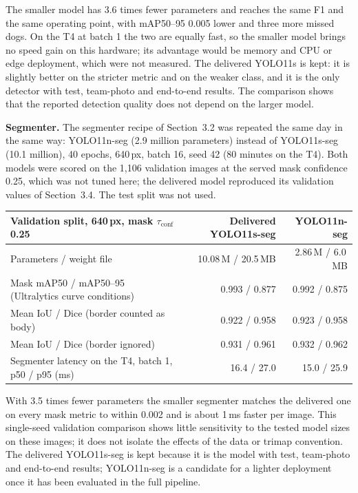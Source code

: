 \documentclass[11pt,a4paper]{article}
\newcommand{\tconf}{$\tau_{\text{conf}}$}
\begin{document}
The smaller model has 3.6 times fewer parameters and reaches the same F1 and the same operating point, with mAP50--95 0.005 lower and three more missed dogs. On the T4 at batch 1 the two are equally fast, so the smaller model brings no speed gain on this hardware; its advantage would be memory and CPU or edge deployment, which were not measured. The delivered YOLO11s is kept: it is slightly better on the stricter metric and on the weaker class, and it is the only detector with test, team-photo and end-to-end results. The comparison shows that the reported detection quality does not depend on the larger model.

\textbf{Segmenter.} The segmenter recipe of Section~3.2 was repeated the same day in the same way: YOLO11n-seg (2.9 million parameters) instead of YOLO11s-seg (10.1 million), 40 epochs, 640\,px, batch 16, seed 42 (80 minutes on the T4). Both models were scored on the 1,106 validation images at the served mask confidence 0.25, which was not tuned here; the delivered model reproduced its validation values of Section~3.4. The test split was not used.

\begin{tabularx}{\linewidth}{@{}Y r r@{}}
\toprule
Validation split, 640\,px, mask \tconf{} 0.25 & Delivered YOLO11s-seg & YOLO11n-seg \\
\midrule
Parameters / weight file & 10.08\,M / 20.5\,MB & 2.86\,M / 6.0\,MB \\
Mask mAP50 / mAP50--95 (Ultralytics curve conditions) & 0.993 / 0.877 & 0.992 / 0.875 \\
Mean IoU / Dice (border counted as body) & 0.922 / 0.958 & 0.923 / 0.958 \\
Mean IoU / Dice (border ignored) & 0.931 / 0.961 & 0.932 / 0.962 \\
Segmenter latency on the T4, batch 1, p50 / p95 (ms) & 16.4 / 27.0 & 15.0 / 25.9 \\
\bottomrule
\end{tabularx}

With 3.5 times fewer parameters the smaller segmenter matches the delivered one on every mask metric to within 0.002 and is about 1\,ms faster per image. This single-seed validation comparison shows little sensitivity to the tested model sizes on these images; it does not isolate the effects of the data or trimap convention. The delivered YOLO11s-seg is kept because it is the model with test, team-photo and end-to-end results; YOLO11n-seg is a candidate for a lighter deployment once it has been evaluated in the full pipeline.
\end{document}
